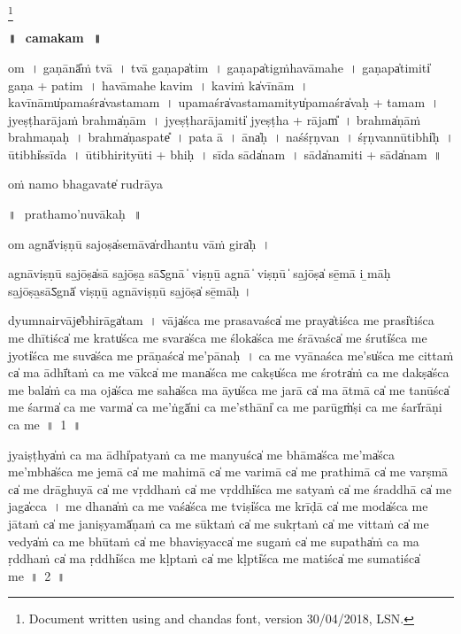 \documentclass[parskip, DIV=14]{scrartcl}
\renewcommand{\thefootnote}{\fnsymbol{footnote}} %
\begin{document}
\LARGE\let\thefootnote\relax\footnote{\color{lightgray} Document written using \XeLaTeX{} and chandas font,  version 30/04/2018, LSN.}

\vspace{-1.5cm}

\begin{center}

\textbf{\Huge॥\,~camakam\,~॥}
\end{center}
\Large

{\centering	


\vspace{1cm}

om~। 
ga॒ṇānā̎ṁ tvā~।
tvā॒ ga॒ṇapa̍tim~।
ga॒ṇapa̍tigṁhavāmahe~।
ga॒ṇapa̍ti॒miti̍ ga॒ṇa + pa॒ti॒m~।
ha॒vā॒ma॒he॒ ka॒vim~।
ka॒viṁ ka̍vī॒nām~।
ka॒vī॒nāmu̍pa॒maśra̍vastamam~। 
u॒pa॒maśra̍vastama॒mityu̍pa॒maśra̍vaḥ + ta॒ma॒m~। 
jye॒ṣṭha॒rāja॒ṁ brahma̍ṇām~।
jye॒ṣṭha॒rāja॒miti̍ jyeṣṭha + rājam̎~।
brahma̍ṇāṁ brahmaṇaḥ~।
brahma̍ṇa॒spate̎~।
pa॒ta॒ ā~।
āna̍ḥ~।
na॒śśṛ॒ṇvan~।
śṛ॒ṇvannū॒tibhi̍ḥ~।
ū॒tibhi̍ssīda~।
ū॒tibhi॒rityū॒ti + bhi॒ḥ~। 
sī॒da॒ sāda̍nam~। 
sāda̍na॒miti॒ + sāda̍nam~॥ 

\vspace{5cm}

oṁ namo bhagavate̍ rudrā॒ya

\newpage
॥\,~prathamo'nuvākaḥ\,~॥\\

\vspace{1cm}

om agnā̍viṣṇū sa॒joṣa̍se॒māva̍rdhantu vā॒ṁ gira̍ḥ~। 

agnāviṣṇū sa̲jōṣa̍sā sa̲jōṣa̲ sāऽgnā ̍
viṣṇū̲ agnā
̍
viṣṇū
̍
sa̲jōṣa̍ sē̲mā i ̲māḥ sa̲jōṣa̲sāऽgnā̍
viṣṇū̲
agnāviṣṇū sa̲jōṣa̍ sē̲māḥ । 



dyu॒mnairvāje̍bhi॒rāga̍tam~। vāja̍śca me prasa॒vaśca̍ me॒ praya̍tiśca me॒ prasi̍tiśca me dhī॒tiśca̍ me॒ kratu̍śca me॒ svara̍śca me॒ śloka̍śca me śrā॒vaśca̍ me॒ śruti̍śca me॒ jyoti̍śca me॒ suva̍śca me prā॒ṇaśca̍ me’pā॒naḥ~। ca॒ me vyā॒naśca॒ me’su̍śca me ci॒ttaṁ ca̍ ma॒ ādhī̍taṁ ca me॒ vākca̍ me॒ mana̍śca me॒ cakṣu̍śca me॒ śrotra̍ṁ ca me॒ dakṣa̍śca me॒ bala̍ṁ ca ma॒ oja̍śca me॒ saha̍śca ma॒ āyu̍śca me ja॒rā ca̍ ma ā॒tmā ca̍ me ta॒nūśca̍ me॒ śarma̍ ca me॒ varma̍ ca॒ me’ṅgā̍ni ca me॒’sthāni̍ ca me॒ parūgṁ̍ṣi ca me॒ śarī̍rāṇi ca me~॥~1~॥

jyaiṣṭhya̍ṁ ca ma॒ ādhi̍patyaṁ ca me ma॒nyuśca̍ me॒ bhāma̍śca॒ me’ma̍śca॒ me’mbha̍śca me je॒mā ca̍ me mahi॒mā ca̍ me vari॒mā ca̍ me prathi॒mā ca̍ me va॒rṣmā ca̍ me drāghu॒yā ca̍ me vṛ॒ddhaṁ ca̍ me॒ vṛddhi̍śca me sa॒tyaṁ ca̍ me śra॒ddhā ca̍ me॒ jaga̍cca~। me॒ dhana̍ṁ ca me॒ vaśa̍śca me॒ tviṣi̍śca me krī॒ḍā ca̍ me॒ moda̍śca me jā॒taṁ ca̍ me jani॒ṣyamā̍ṇaṁ ca me sū॒॒ktaṁ ca̍ me sukṛ॒taṁ ca̍ me vi॒ttaṁ ca̍ me॒ vedya̍ṁ ca me bhū॒॒taṁ ca̍ me bhavi॒ṣyacca̍ me su॒gaṁ ca̍ me su॒patha̍ṁ ca ma ṛ॒ddhaṁ ca̍ ma॒ ṛddhi̍śca me kḷ॒ptaṁ ca̍ me॒ kḷpti̍śca me ma॒tiśca̍ me suma॒tiśca̍ me~॥~2~॥

}
\end{document}
